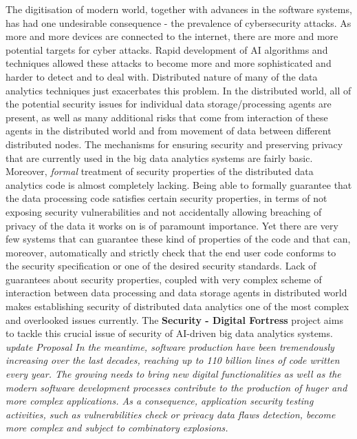 \documentclass[a4paper,11pt]{article}
\newcommand{\project}[1]{\textbf{#1}\xspace}
\newcommand{\SECURITY}{\project{Security - Digital Fortress}}
\newcommand{\TheProject}{\SECURITY}
\begin{document}
The digitisation of modern world, together with advances in the software systems, has had one undesirable consequence - the prevalence of cybersecurity attacks. As more and more devices are connected to the internet, there are more and more potential targets for cyber attacks. Rapid development of AI algorithms and techniques allowed these attacks to become more and more sophisticated and harder to detect and to deal with. Distributed nature of many of the data analytics techniques just exacerbates this problem. In the distributed world, all of the potential security issues for individual data storage/processing agents are present, as well as many additional risks that come from interaction of these agents in the distributed world and from movement of data between different distributed nodes. The mechanisms for ensuring security and preserving privacy that are currently used in the big data analytics systems are fairly basic. Moreover, \emph{formal} treatment of security properties of the distributed data analytics code is almost completely lacking. Being able to formally guarantee that the data processing code satisfies certain security properties, in terms of not exposing security vulnerabilities and not accidentally allowing breaching of privacy of the data it works on is of paramount importance. Yet there are very few systems that can guarantee these kind of properties of the code and that can, moreover, automatically and strictly check that the end user code conforms to the security specification or one of the desired security standards. Lack of guarantees about security properties, coupled with very complex scheme of interaction between data processing and data storage agents in distributed world makes establishing security of distributed data analytics one of the most complex and overlooked issues currently. The \TheProject{} project aims to tackle this crucial issue of security of AI-driven big data analytics systems.
\textit{
{\color{blue} \YAGshort{} update Proposal} In the meantime, software production have been tremendously increasing over the last decades, reaching up to 110 billion lines of code written every year. The growing needs to bring new digital functionalities as well as the modern software development processes contribute to the production of huger and more complex applications. As a consequence, application security testing activities, such as vulnerabilities check or privacy data flaws detection, become more complex and subject to combinatory explosions.
}
\end{document}
